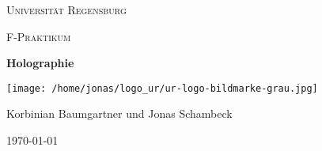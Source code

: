 \begin{titlepage}
	\centering
	{\scshape \LARGE Universität Regensburg \par}
	\vspace{1cm}
	{\scshape\Large F-Praktikum\par}
	\vspace{1.5cm}
	{\huge\bfseries Holographie\par}
	\vspace{2cm}
	\texttt{[image: /home/jonas/logo\_ur/ur-logo-bildmarke-grau.jpg]}\par
	\vfill
	{\large Korbinian Baumgartner und Jonas Schambeck\par}

	\vfill

	{\large \today\par}
\end{titlepage}
